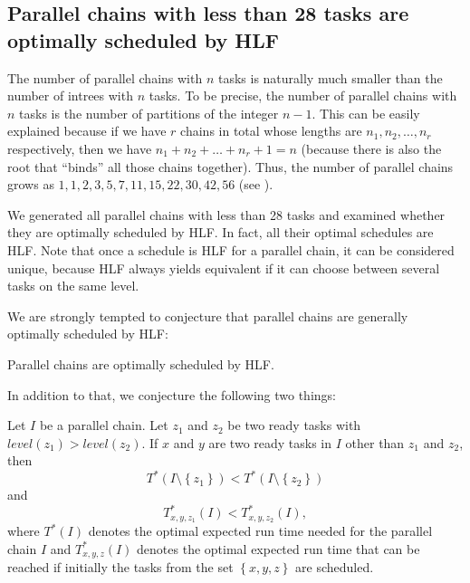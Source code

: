 \subsection{Parallel chains with less than 28 tasks are optimally scheduled by HLF}
\label{sec:parallel-chains-optimally-hlf}

\newcommand{\chainlengths}[1]{(#1)}

The number of parallel chains with $n$ tasks is naturally much smaller than the number of intrees with $n$ tasks. To be precise, the number of parallel chains with $n$ tasks is the number of partitions of the integer $n-1$. This can be easily explained because if we have $r$ chains in total whose lengths are $n_1,n_2,\dots,n_r$ respectively, then we have $n_1+n_2+\dots+n_r+1 = n$ (because there is also the root that ``binds'' all those chains together). Thus, the number of parallel chains grows as $1, 1, 2, 3, 5, 7, 11, 15, 22, 30, 42, 56$ (see \cite{oeispartitionnumbers}).

We generated all parallel chains with less than 28 tasks and examined whether they are optimally scheduled by HLF. In fact, all their optimal schedules are HLF. Note that once a schedule is HLF for a parallel chain, it can be considered unique, because HLF always yields equivalent if it can choose between several tasks on the same level.

We are strongly tempted to conjecture that parallel chains are generally optimally scheduled by HLF:

\begin{conjecture}
  \label{conj:parallel-chains-hlf-conjecture}
  Parallel chains are optimally scheduled by HLF.
\end{conjecture}

In addition to that, we conjecture the following two things:

\begin{conjecture}
  \label{conj:parallel-chains-complex-conjecture}
  Let $I$ be a parallel chain. Let $z_1$ and $z_2$ be two ready tasks with $level(z_1) > level(z_2)$. If $x$ and $y$ are two ready tasks in $I$ other than $z_1$ and $z_2$, then
  \begin{equation*}
    T^*(I\setminus\left\{ z_1 \right\}) < T^*(I\setminus\left\{ z_2 \right\})
  \end{equation*}
  and 
  \begin{equation*}
    T^*_{x,y,z_1}(I) < T^*_{x,y,z_2}(I),
  \end{equation*}
  where $T^*(I)$ denotes the optimal expected run time needed for the parallel chain $I$ and $T_{x,y,z}^*(I)$ denotes the optimal expected run time that can be reached if initially the tasks from the set $\left\{ x,y,z \right\}$ are scheduled.
\end{conjecture}

